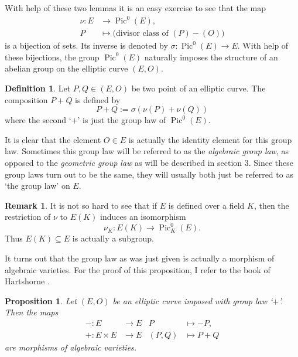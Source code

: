\documentclass{article}
\numberwithin{equation}{section}
\newtheorem{proposition}[theorem]{Proposition}
\theoremstyle{definition}
\newtheorem{definition}[theorem]{Definition}
\newtheorem{remark}[theorem]{Remark}
\newcommand{\Pic}{\operatorname{Pic}} %
\begin{document}
With help of these two lemmas it is an easy exercise to see that the map  \begin{align*} \nu: E &\rightarrow \Pic ^0 (E), \\ P & \mapsto \big(\text{divisor class of } (P)-(O)\big) \end{align*} is a bijection of sets. Its inverse is denoted by $\sigma: \Pic^0 (E) \rightarrow E$. With help of these bijections, the group $\Pic^0(E)$ naturally imposes the structure of an abelian group on the elliptic curve $(E,O)$.

\begin{definition}\label{grplawgeneral}
Let $P,Q \in (E,O)$ be two point of an elliptic curve. The composition $P+Q$ is defined by $$ P+Q := \sigma(\nu(P)+\nu(Q))$$ where the second `$+$' is just the group law of $\Pic^0(E)$. 
\end{definition}

It is clear that the element $O \in E$ is actually the identity element for this group law. Sometimes this group law will be referred to as the \emph{algebraic group law}, as opposed to the \emph{geometric group law} as will be described in section 3. Since these group laws turn out to be the same, they will usually both just be referred to as `the group law' on $E$.

\begin{remark}
It is not so hard to see that if $E$ is defined over a field $K$, then the restriction of $\nu$ to $E(K)$ induces an isomorphism $$\nu_K: E(K) \rightarrow \Pic^0_K(E).$$ Thus $E(K) \subseteq E$ is actually a subgroup.
\end{remark} 

It turns out that the group law as was just given is actually a morphism of algebraic varieties. For the proof of this proposition, I refer to the book of Hartshorne \cite[IV.4.7]{Hartshorne}. 

\begin{proposition}\label{multismorphism}
Let $(E,O)$ be an elliptic curve imposed with group law `$+$'. Then the maps \begin{align*} -: E &\rightarrow E  &P&\mapsto -P,\\ +: E\times E  &\rightarrow E  &(P,Q)&\mapsto P+Q \end{align*} are morphisms of algebraic varieties. 
\end{proposition}
\end{document}

